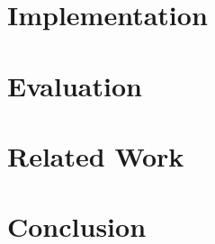 \documentclass[MS]{iitmdiss}
\newcommand{\clearemptydoublepage}{\newpage{\cleardoublepage}}
\begin{document}

\clearemptydoublepage

\chapter{Implementation}
\label{chap:implementation}



\clearemptydoublepage

\chapter{Evaluation}
\label{chap:evaluation}



\clearemptydoublepage

\chapter{Related Work}
\label{chap:related_work}



\clearemptydoublepage

\chapter{Conclusion}
\label{chap:conclusion}




%
%
%
%
%
%
%
%
%



\begin{singlespace}
  
\end{singlespace}



\listofpapers

\end{document}
